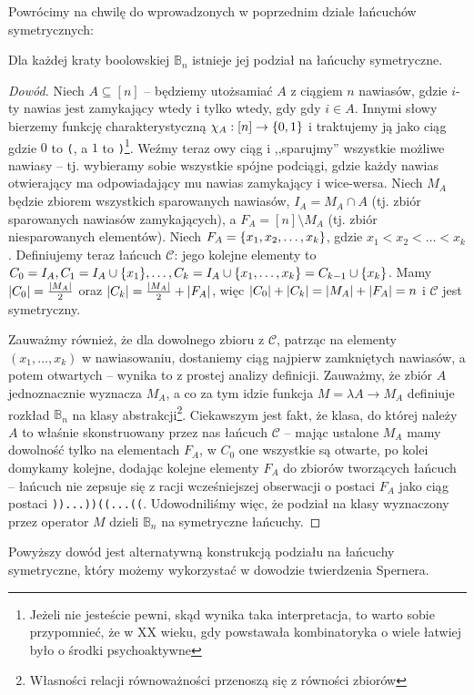 Powrócimy na chwilę do wprowadzonych w poprzednim dziale łańcuchów symetrycznych:
\begin{theorem}
	Dla każdej kraty boolowskiej \(\mathbb B_n\) istnieje jej podział na łańcuchy symetryczne.
\end{theorem}
\begin{proof}[Dowód]
	Niech \(A \subseteq [n]\) -- będziemy utożsamiać \(A\) z ciągiem \(n\) nawiasów, gdzie
	\(i\)-ty nawias jest zamykający wtedy i tylko wtedy, gdy gdy \(i \in A\). Innymi słowy
	bierzemy funkcję charakterystyczną \(\chi_A: [n] \to \set{0, 1}\) i traktujemy
	ją jako ciąg gdzie \(0\) to \texttt{(}, a \(1\) to \texttt{)}\footnote{Jeżeli nie jesteście pewni,
		skąd wynika taka interpretacja, to warto sobie przypomnieć, że w XX wieku, gdy
		powstawała kombinatoryka o wiele łatwiej było o środki psychoaktywne}. Weźmy teraz owy ciąg i ,,sparujmy''
	wszystkie możliwe nawiasy -- tj. wybieramy sobie wszystkie spójne podciągi,
	gdzie każdy nawias otwierający ma odpowiadający mu nawias zamykający i wice-wersa.
	Niech \(M_A\) będzie zbiorem wszystkich sparowanych nawiasów, \(I_A = M_A \cap A\)
	(tj. zbiór sparowanych nawiasów zamykających), a \(F_A = [n] \setminus M_A\) (tj. zbiór niesparowanych elementów).
	Niech \(F_A = \set{x_1, x_2, \ldots, x_k}\), gdzie \(x_1 < x_2 < \ldots < x_k\).
	Definiujemy teraz łańcuch \(\mathcal C\): jego kolejne elementy to \(C_0 =
	I_A, C_1 = I_A\cup\set{x_1}, \ldots, C_k = I_A\cup\set{x_1,\ldots,x_k} = C_{k-1} \cup \set{x_k}\).
	Mamy \(\card{C_0} = \frac{\card{M_A}}2\) oraz \(\card{C_k} = \frac{\card{M_A}}2 +
	\card{F_A}\), więc \(\card{C_0}+\card{C_k} = \card{M_A}+\card{F_A} = n\) i \(\mathcal C\) jest symetryczny.

	Zauważmy również, że dla dowolnego zbioru z \(\mathcal C\), patrząc na elementy \((x_1,\ldots,x_k)\)
	w nawiasowaniu, dostaniemy ciąg najpierw zamkniętych nawiasów, a potem otwartych -- wynika to z prostej analizy definicji.
	Zauważmy, że zbiór \(A\) jednoznacznie wyznacza \(M_A\), a co za tym idzie funkcja \(M = \lambda A \to M_A\) definiuje
	rozkład \(\mathbb B_n\) na klasy abstrakcji\footnote{Własności relacji równoważności przenoszą się z równości zbiorów}.
	Ciekawszym jest fakt, że klasa, do której należy \(A\) to właśnie skonstruowany przez nas łańcuch \(\mathcal C\)
	-- mając ustalone \(M_A\) mamy dowolność tylko na elementach \(F_A\),
	w \(C_0\) one wszystkie są otwarte, po kolei domykamy kolejne, dodając kolejne elementy \(F_A\)
	do zbiorów tworzących łańcuch -- łańcuch nie zepsuje się z racji wcześniejszej obserwacji
	o postaci \(F_A\) jako ciąg postaci \texttt{))...))((...((}.
	Udowodniliśmy więc, że podział na klasy wyznaczony przez operator \(M\) dzieli \(\mathbb B_n\) na symetryczne łańcuchy.
\end{proof}
Powyższy dowód jest alternatywną konstrukcją podziału na łańcuchy symetryczne, który możemy wykorzystać
w dowodzie twierdzenia Spernera.

